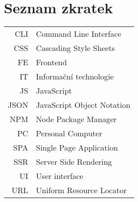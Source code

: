 
\chapter{Seznam zkratek}

\begin{tabular}{rl}
    CLI     & Command Line Interface \\
    CSS     & Cascading Style Sheets \\
    FE      & Frontend \\
    IT      & Informační technologie \\
    JS      & JavaScript \\
    JSON    & JavaScript Object Notation \\
    NPM     & Node Package Manager \\
    PC      & Personal Computer \\
    SPA     & Single Page Application \\
    SSR     & Server Side Rendering \\
    UI      & User interface \\
    URL     & Uniform Resource Locator \\
\end{tabular}
